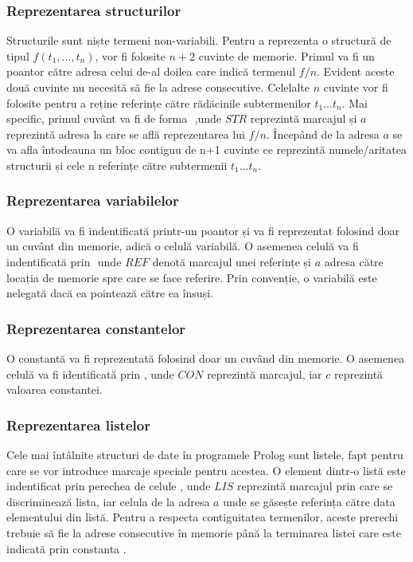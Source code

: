 \documentclass[12pt,a4paper,twoside]{report}
\begin{document}
\subsubsection{Reprezentarea structurilor}
Structurile sunt niște termeni non-variabili. Pentru a reprezenta o structură de tipul \(f(t_{1}, ... , t_{n})\), vor fi folosite \(n+2\) cuvinte de memorie. Primul va fi un poantor către adresa celui de-al doilea care indică termenul \(f/n\). Evident aceste două cuvinte nu necesită să fie la adrese consecutive. Celelalte \(n\) cuvinte vor fi folosite pentru a reține referințe către rădăcinile subtermenilor \(t_{1} ... t_{n}\). Mai specific, primul cuvânt va fi de forma \(<STR, a>\) ,unde \(STR\) reprezintă marcajul și \(a\) reprezintă adresa la care se află reprezentarea lui \(f/n\). Începând de la adresa \(a\) se va afla întodeauna un bloc contiguu de n+1 cuvinte ce reprezintă numele/aritatea structurii și cele n referințe către subtermenii \(t_{1} ... t_{n}\).
\subsubsection{Reprezentarea variabilelor}
O variabilă va fi indentificată printr-un poantor și va fi reprezentat folosind doar un cuvânt din memorie, adică o celulă variabilă. O asemenea celulă va fi indentificată prin \(<REF, a>\) unde \(REF\) denotă marcajul unei referințe și \(a\) adresa către locația de memorie spre care se face referire. Prin convenție, o variabilă este nelegată dacă ea pointează către ea însuși.
\subsubsection{Reprezentarea constantelor}
O constantă va fi reprezentată folosind doar un cuvând din memorie. O asemenea celulă va fi identificată prin \(<CON, c>\), unde \(CON\) reprezintă marcajul, iar \(c\) reprezintă valoarea constantei.
\subsubsection{Reprezentarea listelor}
Cele mai întâlnite structuri de date în programele Prolog sunt listele, fapt pentru care se vor introduce marcaje speciale pentru acestea. O element dintr-o listă este indentificat prin perechea de celule \(<LIS, a>\), unde  \(LIS\) reprezintă marcajul prin care se discriminează lista, iar celula de la adresa \(a\) unde se găsește referința către data elementului din listă. Pentru a respecta contiguitatea termenilor, aceste prerechi trebuie să fie la adrese consecutive în memorie până la terminarea listei care este indicată prin constanta \(<CON, NIL>\).
\end{document}
